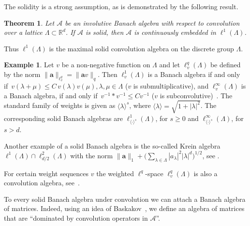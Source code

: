\documentclass[12pt]{amsart}
\newtheorem{theorem}{Theorem}[section]
\theoremstyle{definition}
\newtheorem{example}{Example}[section]
\theoremstyle{remark}
\numberwithin{equation}{section}
\def\cA{\mathcal{A}}
\def\bR{{\mathbb{R}}}
\def\rd{\bR^d}
\def\inv{^{-1}}
\def\cA{\mathcal{A}}
\newcommand{\fif}{if and only if}
\newcommand{\Cal}{\mathcal}
\newcommand{\la}{\lambda}
\newcommand{\La}{\Lambda}
\newcommand{\lan}{\langle}
\newcommand{\ran}{\rangle}
\newcommand{\ac}{\Cal A}
\begin{document}
The solidity is a strong assumption, as is demonstrated by the
following result.


\begin{theorem}\label{alla}
Let $\Cal A$ be an involutive  Banach algebra with respect to
convolution  over  a lattice $\La\subset\rd$. If $\ac$ is solid,
then $\Cal A $ is
continuously embedded in $
\ell ^1(\La)$.
\end{theorem}

Thus $\ell ^1(\Lambda )$ is the maximal solid convolution algebra
on
the discrete group $\Lambda $.


\begin{example}\label{example1} Let $v$ be a non-negative function on $\Lambda
$
and let $\ell^q_v (\Lambda )$ be defined by the norm
$\|\mathbf{a}\|_{\ell^q_v } =  \| \mathbf{a} v\|_{q}$. Then $\ell
^1_v(\Lambda )$ is a Banach algebra \fif\ $v(\lambda +\mu ) \leq
C\, v(\lambda ) v(\mu ), \lambda ,\mu \in \Lambda $ ($v$ is
submultiplicative), and $\ell ^\infty _v(\Lambda )$ is a Banach
algebra, \fif\ $v\inv \ast v\inv \leq C v\inv $ ($v$ is
subconvolutive)~\cite{feichtinger79}. The standard family of weights is given
as $\lan\la\ran^s$, where $\lan\la\ran=\sqrt{1+|\la|^2}$. The
corresponding solid Banach algebras are $\ell
^1_{\lan\cdot\ran^s}(\Lambda )$, for $s\ge 0$ and $\ell
^\infty_{\lan\cdot\ran^s}(\Lambda )$, for $s> d$.

Another example of a solid Banach algebra is the so-called Krein
algebra $\ell ^1(\La) \cap \ell ^2 _{d/2}(\La)$ with the norm
$\|\mathbf{a}\|_1 + \Big( \sum _{\lambda \in \Lambda }  |a_\lambda
|^2 |\lambda |^{d} \Big) ^{1/2}$, see \cite{bra75}.

 For certain weight
sequences  $v$ the weighted $\ell ^q$-space $\ell^q_v(\La) $ is
also a convolution algebra, see~\cite{feichtinger79}.

\end{example}

 To every  solid Banach
algebra under convolution we can attach a Banach algebra of
matrices.
Indeed, using an idea of Baskakov~\cite{Bas90}, we  define an algebra
of matrices that are ``dominated by convolution operators in $\cA
$''.
\end{document}
